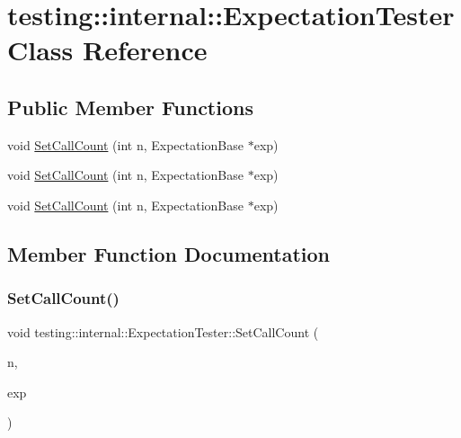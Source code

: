 \hypertarget{classtesting_1_1internal_1_1_expectation_tester}{}\section{testing\+::internal\+::Expectation\+Tester Class Reference}
\label{classtesting_1_1internal_1_1_expectation_tester}
\subsection*{Public Member Functions}
\begin{DoxyCompactItemize}
\item 
void \mbox{\hyperlink{classtesting_1_1internal_1_1_expectation_tester_af5d762355ef83f414c4b0fc14c8fc943}{Set\+Call\+Count}} (int n, Expectation\+Base $\ast$exp)
\item 
void \mbox{\hyperlink{classtesting_1_1internal_1_1_expectation_tester_af5d762355ef83f414c4b0fc14c8fc943}{Set\+Call\+Count}} (int n, Expectation\+Base $\ast$exp)
\item 
void \mbox{\hyperlink{classtesting_1_1internal_1_1_expectation_tester_af5d762355ef83f414c4b0fc14c8fc943}{Set\+Call\+Count}} (int n, Expectation\+Base $\ast$exp)
\end{DoxyCompactItemize}


\subsection{Member Function Documentation}
\mbox{\label{classtesting_1_1internal_1_1_expectation_tester_af5d762355ef83f414c4b0fc14c8fc943}} 
\subsubsection{\texorpdfstring{SetCallCount()}{SetCallCount()}\hspace{0.1cm}{\footnotesize\ttfamily [1/3]}}
{\footnotesize\ttfamily void testing\+::internal\+::\+Expectation\+Tester\+::\+Set\+Call\+Count (\begin{DoxyParamCaption}\item[{int}]{n,  }\item[{Expectation\+Base $\ast$}]{exp }\end{DoxyParamCaption})\hspace{0.3cm}{\ttfamily [inline]}}

